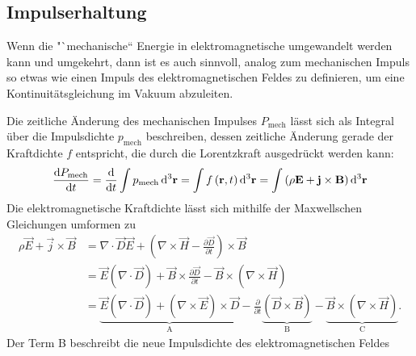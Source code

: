 \subsection{Impulserhaltung}

Wenn die "`mechanische`` Energie in elektromagnetische umgewandelt werden kann und umgekehrt, dann ist es auch sinnvoll, analog zum mechanischen Impuls so etwas wie einen Impuls des elektromagnetischen Feldes zu definieren, um eine Kontinuitätsgleichung im Vakuum abzuleiten.

Die zeitliche Änderung des mechanischen Impulses $P_{\mathrm{mech}}$ lässt sich als Integral über die Impulsdichte $p_{\mathrm{mech}}$ beschreiben, dessen zeitliche Änderung gerade der Kraftdichte $f$ entspricht, die durch die Lorentzkraft ausgedrückt werden kann:
\begin{equation*}
	\frac{\diff P_{\mathrm{mech}}}{\diff t}=\frac{\diff }{\diff t}\int p_{\mathrm{mech}}\diffa[3]{\vec{r}}=\int f\left(\vec {r},t\right)\diffa[3]{\vec{r}}=\int \left(\rho \vec {E}+\vec {j}\times \vec {B}\right)\diffa[3]{\vec{r}}
\end{equation*}
Die elektromagnetische Kraftdichte lässt sich mithilfe der Maxwellschen Gleichungen umformen zu
\begin{align*}
	\rho \vec {E}+\vec {j}\times \vec {B} & =\nabla \cdot \vec {D}\vec {E}+\left(\nabla \times \vec {H}-\frac{\partial \vec {D}}{\partial t}\right)\times \vec {B}                                                                                                                                                                                                          \\
	                                      & =\vec {E}\left(\nabla \cdot \vec {D}\right)+\vec {B}\times \frac{\partial \vec {D}}{\partial t}-\vec {B}\times \left(\nabla \times \vec {H}\right)                                                                                                                                                                              \\
	                                      & =\underset{\mathrm{A}}{\underbrace{\vec {E}\left(\nabla \cdot \vec {D}\right)+\left(\nabla \times \vec {E}\right)\times \vec {D}}}-\frac{\partial }{\partial t}\underset{\mathrm{B}}{\underbrace{\left(\vec {D}\times \vec {B}\right)}}-\underset{\mathrm{C}}{\underbrace{\vec {B}\times \left(\nabla \times \vec {H}\right)}}.
\end{align*}
Der Term B beschreibt die neue Impulsdichte des elektromagnetischen Feldes
